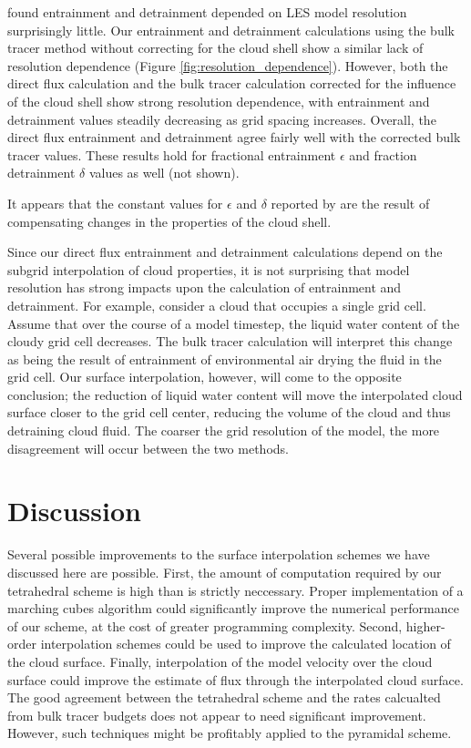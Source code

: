 \documentclass[12pt]{article}
\begin{document}
\cite{Brown1999} found entrainment and detrainment depended on LES model 
resolution surprisingly little.  Our entrainment and detrainment calculations 
using the bulk tracer method without correcting for the cloud shell show a
similar lack of resolution dependence (Figure \ref{fig:resolution_dependence}).
However, both the direct flux calculation and the bulk tracer calculation 
corrected for the influence of the cloud shell show strong resolution
dependence, with entrainment and detrainment values steadily decreasing as 
grid spacing increases.  Overall, the direct flux entrainment and detrainment 
agree fairly well with the corrected bulk tracer values.  These results hold 
for fractional entrainment $\epsilon$ and fraction detrainment $\delta$ values
as well (not shown).

It appears that the constant values for $\epsilon$ and $\delta$ reported by 
\cite{Brown1999} are the result of compensating changes in the properties of 
the cloud shell.


Since our direct flux entrainment and detrainment calculations depend on the 
subgrid interpolation of cloud properties, it is not surprising that model 
resolution has strong impacts upon the calculation of entrainment and 
detrainment.  For example, consider a cloud that occupies a single grid cell.  
Assume that over the course of a model timestep, the liquid water content of 
the cloudy grid cell decreases.  The bulk tracer calculation will interpret 
this change as being the result of entrainment of environmental air drying the 
fluid in the grid cell.  Our surface interpolation, however, will come to the 
opposite conclusion; the reduction of liquid water content will move the 
interpolated cloud surface closer to the grid cell center, reducing the volume 
of the cloud and thus detraining cloud fluid.  The coarser the grid resolution 
of the model, the more disagreement will occur between the two methods.




\section{Discussion}

Several possible improvements to the surface interpolation schemes we have 
discussed here are possible.  First, the amount of computation required by our 
tetrahedral scheme is high than is strictly neccessary.  Proper implementation
of a marching cubes algorithm could significantly improve the numerical 
performance of our scheme, at the cost of greater programming complexity.
Second, higher-order interpolation schemes could be used to improve the
calculated location of the cloud surface.  Finally, interpolation of the model 
velocity over the cloud surface could improve the estimate of flux through the 
interpolated cloud surface.  The good agreement between the tetrahedral scheme
and the rates calcualted from bulk tracer budgets does not appear to need 
significant improvement.  However, such techniques might be profitably applied
to the pyramidal scheme.
\end{document}
